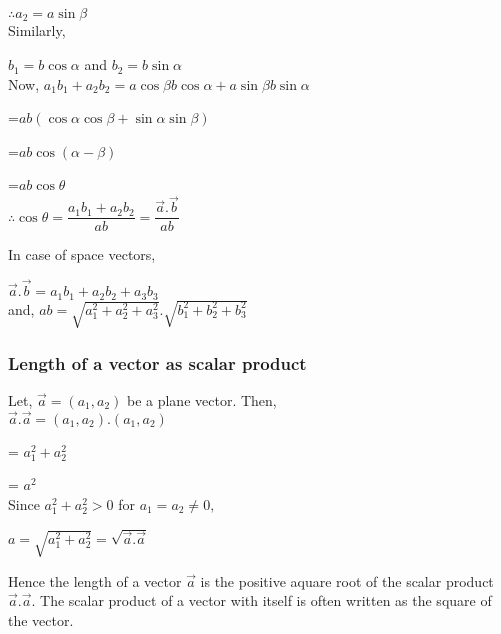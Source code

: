 \documentclass[11pt]{article}
\begin{document}
\hspace{-0.4cm}$\therefore a_2=a\sin\beta$\\
Similarly,


$b_1=b\cos\alpha$ and $b_2=b\sin\alpha$\\
Now, 
$a_1 b_1 + a_2 b_2=a\cos\beta b\cos\alpha + a\sin\beta b\sin\alpha$


\hspace{2.4cm}=$ab(\cos\alpha \cos\beta + \sin\alpha \sin\beta)$


\hspace{2.4cm}=$ab \cos(\alpha - \beta)$


\hspace{2.4cm}=$ab\cos\theta$\\[0.5cm]
$\therefore$\hspace{0.5cm}$\cos\theta = \dfrac{a_1 b_1 + a_2 b_2}{ab}=\dfrac{\overrightarrow{a}.\overrightarrow{b}}{ab}$


In case of space vectors,


$\overrightarrow{a}.\overrightarrow{b}=a_1 b_1 + a_2 b_2 +a_3 b_3$ \\and,  $ab=\sqrt{a_1^2 + a_2^2 + a_3^2}.\sqrt{b_1^2 + b_2^2 + b_3^2}$


\subsubsection{Length of a vector as scalar product}
Let, $\overrightarrow{a}=(a_1,a_2)$ be a plane vector. Then,\\
$\overrightarrow{a}.\overrightarrow{a}=(a_1,a_2).(a_1,a_2)$


\hspace{0.4cm}= $a_1 ^2 + a_2 ^2$


\hspace{0.4cm}= $a^2$\\
Since $a_1 ^2 + a_2 ^2 > 0$ for $a_1=a_2\neq0,$


$a=\sqrt{a_1 ^2 + a_2 ^2}=\sqrt{\overrightarrow{a}.\overrightarrow{a}}$


\vspace{0.4cm}
Hence the length of a vector $\overrightarrow{a}$ is the positive aquare root of the scalar product $\overrightarrow{a}.\overrightarrow{a}.$ The scalar product of a vector with itself is often written as the square of the vector.
\newpage
\end{document}
